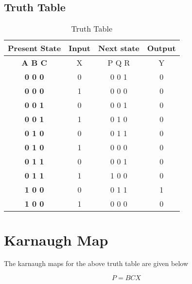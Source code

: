 \documentclass{article}
\begin{document}
\subsection{Truth Table}
  
  \vspace{5mm}
  \begin{table}[h]
  \centering
  \begin{tabular}{|c|c|c|c|}
  \hline
   
   \textbf{Present State}&{Input}&{Next state}&{Output}\\
   \hline
   \textbf{A B C}&{X}&{P Q R}&{Y}\\
   \hline	  
   \textbf{0 0 0}&{0}&{0 0 1}&{0}\\
   \textbf{0 0 0}&{1}&{0 0 0}&{0}\\
   \textbf{0 0 1}&{0}&{0 0 1}&{0}\\
   \textbf{0 0 1}&{1}&{0 1 0}&{0}\\
   \textbf{0 1 0}&{0}&{0 1 1}&{0}\\
   \textbf{0 1 0}&{1}&{0 0 0}&{0}\\
   \textbf{0 1 1}&{0}&{0 0 1}&{0}\\
   \textbf{0 1 1}&{1}&{1 0 0}&{0}\\
   \textbf{1 0 0}&{0}&{0 1 1}&{1}\\
   \textbf{1 0 0}&{1}&{0 0 0}&{0}\\
  \hline
  \end{tabular}
  \vspace{5mm}
  \caption{Truth Table}
  \label{Table:2}
  \end{table}

\newpage
\section{Karnaugh Map}
  The karnaugh maps for the above truth table are given below

 \vspace{5mm}

\begin{karnaugh-map}[4][4][1][$CX$][$AB$]
	\autoterms[$X$]

    \end{karnaugh-map}
    \newline                                         
    \begin{equation}                                   P=BCX      
    \label{eq1}                
    \end{equation}
\end{document}
